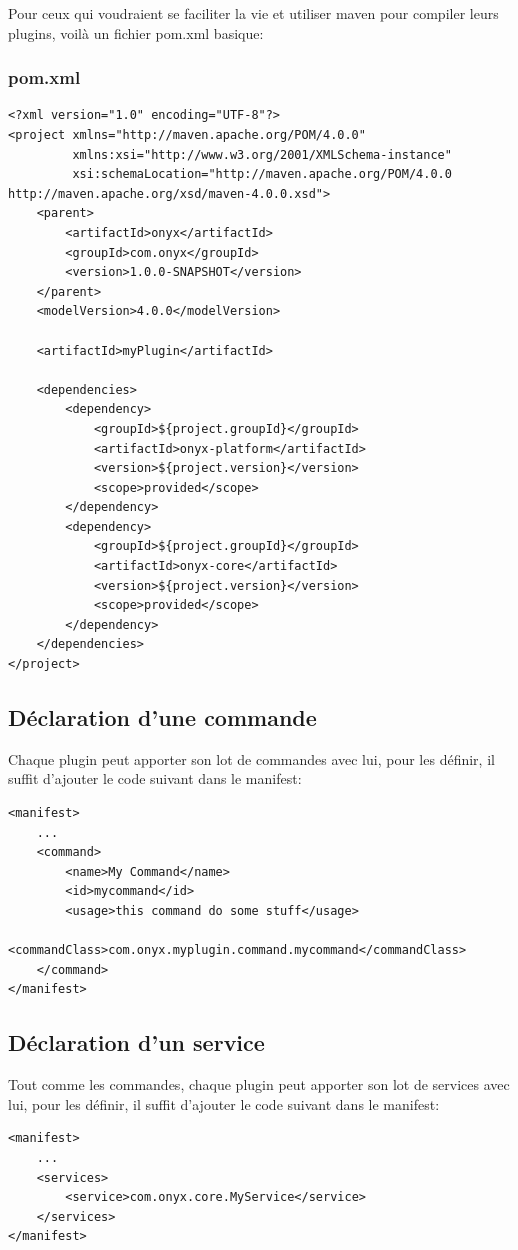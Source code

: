 Pour ceux qui voudraient se faciliter la vie et utiliser maven pour compiler leurs plugins, voilà un fichier pom.xml basique:
\subsubsection{pom.xml}
\begin{verbatim}
<?xml version="1.0" encoding="UTF-8"?>
<project xmlns="http://maven.apache.org/POM/4.0.0"
         xmlns:xsi="http://www.w3.org/2001/XMLSchema-instance"
         xsi:schemaLocation="http://maven.apache.org/POM/4.0.0 http://maven.apache.org/xsd/maven-4.0.0.xsd">
    <parent>
        <artifactId>onyx</artifactId>
        <groupId>com.onyx</groupId>
        <version>1.0.0-SNAPSHOT</version>
    </parent>
    <modelVersion>4.0.0</modelVersion>

    <artifactId>myPlugin</artifactId>

    <dependencies>
        <dependency>
            <groupId>${project.groupId}</groupId>
            <artifactId>onyx-platform</artifactId>
            <version>${project.version}</version>
            <scope>provided</scope>
        </dependency>
        <dependency>
            <groupId>${project.groupId}</groupId>
            <artifactId>onyx-core</artifactId>
            <version>${project.version}</version>
            <scope>provided</scope>
        </dependency>
    </dependencies>
</project>
\end{verbatim}

\subsection{Déclaration d'une commande}

Chaque plugin peut apporter son lot de commandes avec lui, pour les définir, il suffit d'ajouter le code suivant dans le manifest:

\begin{verbatim}
<manifest>
    ...
    <command>
        <name>My Command</name>
        <id>mycommand</id>
        <usage>this command do some stuff</usage>
        <commandClass>com.onyx.myplugin.command.mycommand</commandClass>
    </command>
</manifest>
\end{verbatim}

\subsection{Déclaration d'un service}
Tout comme les commandes, chaque plugin peut apporter son lot de services avec lui, pour les définir, il suffit d'ajouter le code suivant dans le manifest:
\begin{verbatim}
<manifest>
    ...
    <services>
        <service>com.onyx.core.MyService</service>
    </services>
</manifest>
\end{verbatim}